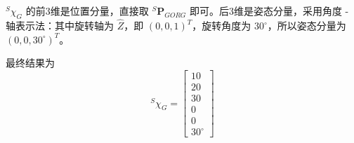 \documentclass{homework}
\begin{document}
\question

\begin{sol}

$ ^S\chi_G $ 的前3维是位置分量，直接取 $ ^S\mathbf{P}_{GORG} $ 即可。后3维是姿态分量，采用角度 - 轴表示法：其中旋转轴为 $ \hat{Z} $，即 $ (0, 0, 1)^T $，旋转角度为 $ 30^\circ $，所以姿态分量为 $ (0, 0, 30^\circ)^T $。

最终结果为
\[
^S\chi_G = \begin{bmatrix}
   10 \\ 20 \\ 30 \\ 0 \\ 0 \\ 30^\circ
\end{bmatrix}
\]

\end{sol}
\end{document}

